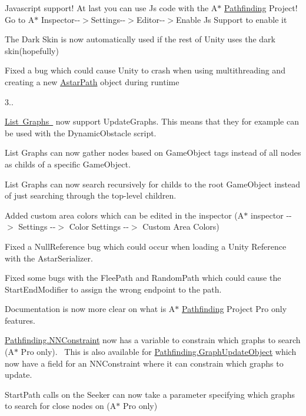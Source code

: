 \begin{DoxyItemize}
\begin{DoxyItemize}
\item Javascript support! At last you can use Js code with the A$\ast$ \mbox{\hyperlink{namespace_pathfinding}{Pathfinding}} Project! Go to A$\ast$ Inspector-\/-\/$>$Settings-\/-\/$>$Editor-\/-\/$>$Enable Js Support to enable it
\item The Dark Skin is now automatically used if the rest of Unity uses the dark skin(hopefully)
\item Fixed a bug which could cause Unity to crash when using multithreading and creating a new \mbox{\hyperlink{class_astar_path}{Astar\+Path}} object during runtime
\end{DoxyItemize}
\item 3..
\begin{DoxyItemize}
\item \mbox{\hyperlink{class_pathfinding_1_1_point_graph}{List Graphs }} now support Update\+Graphs. This means that they for example can be used with the Dynamic\+Obstacle script.
\item List Graphs can now gather nodes based on Game\+Object tags instead of all nodes as childs of a specific Game\+Object.
\item List Graphs can now search recursively for childs to the \textquotesingle{}root\textquotesingle{} Game\+Object instead of just searching through the top-\/level children.
\item Added custom area colors which can be edited in the inspector (A$\ast$ inspector -\/-\/$>$ Settings -\/-\/$>$ Color Settings -\/-\/$>$ Custom Area Colors)
\item Fixed a Null\+Reference bug which could occur when loading a Unity Reference with the Astar\+Serializer.
\item Fixed some bugs with the Flee\+Path and Random\+Path which could cause the Start\+End\+Modifier to assign the wrong endpoint to the path.
\item Documentation is now more clear on what is A$\ast$ \mbox{\hyperlink{namespace_pathfinding}{Pathfinding}} Project Pro only features.
\item \mbox{\hyperlink{class_pathfinding_1_1_n_n_constraint}{Pathfinding.\+N\+N\+Constraint}} now has a variable to constrain which graphs to search (A$\ast$ Pro only).~\newline
 This is also available for \mbox{\hyperlink{class_pathfinding_1_1_graph_update_object}{Pathfinding.\+Graph\+Update\+Object}} which now have a field for an N\+N\+Constraint where it can constrain which graphs to update.
\item Start\+Path calls on the Seeker can now take a parameter specifying which graphs to search for close nodes on (A$\ast$ Pro only)

\end{DoxyItemize}
\end{DoxyItemize}
